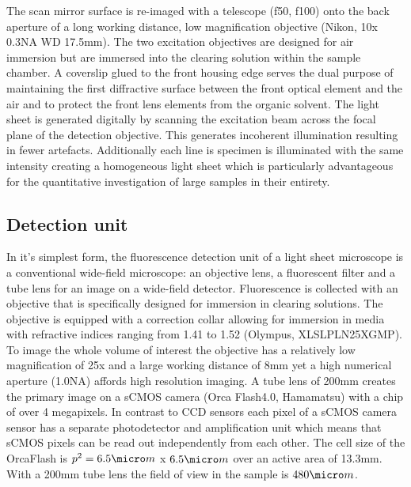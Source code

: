 \documentclass[12pt]{spieman}  %
\begin{document}
The scan mirror surface is re-imaged with a telescope (f50, f100) onto the back aperture of a long working distance, low magnification objective (Nikon, 10x 0.3NA WD 17.5mm). The two excitation objectives are designed for air immersion but are immersed into the clearing solution within the sample chamber. A coverslip glued to the front housing edge serves the dual purpose of maintaining the first diffractive surface between the front optical element and the air and to protect the front lens elements from the organic solvent. The light sheet is generated digitally\cite{Keller2008a,Keller2008b} by scanning the excitation beam across the focal plane of the detection objective. This generates incoherent illumination resulting in fewer artefacts.%
Additionally each line is specimen is illuminated with the same intensity creating a homogeneous light sheet which is particularly advantageous for the quantitative investigation of large samples in their entirety.



	
\subsection{Detection unit}
		
		
In it's simplest form, the fluorescence detection unit of a light sheet microscope is a conventional wide-field microscope: an objective lens, a fluorescent filter and a tube lens for an image on a wide-field detector. Fluorescence is collected with an objective that is specifically designed for immersion in clearing solutions. The objective is equipped with a correction collar allowing for immersion in media with refractive indices ranging from 1.41 to 1.52 (Olympus, XLSLPLN25XGMP). To image the whole volume of interest the objective has a relatively low magnification of 25x and a large working distance of 8mm yet a high numerical aperture (1.0NA) affords high resolution imaging. A tube lens of 200mm creates the primary image on a sCMOS camera (Orca Flash4.0, Hamamatsu) with a chip of over 4 megapixels. In contrast to CCD sensors each pixel of a sCMOS camera sensor has a separate photodetector and amplification unit which means that sCMOS pixels can be read out independently from each other. The cell size of the OrcaFlash is $p^2= 6.5\micro m$ x $6.5\micro m$ over an active area of 13.3mm. With a 200mm tube lens the field of view in the sample is $480\micro m$. 
\end{document}

